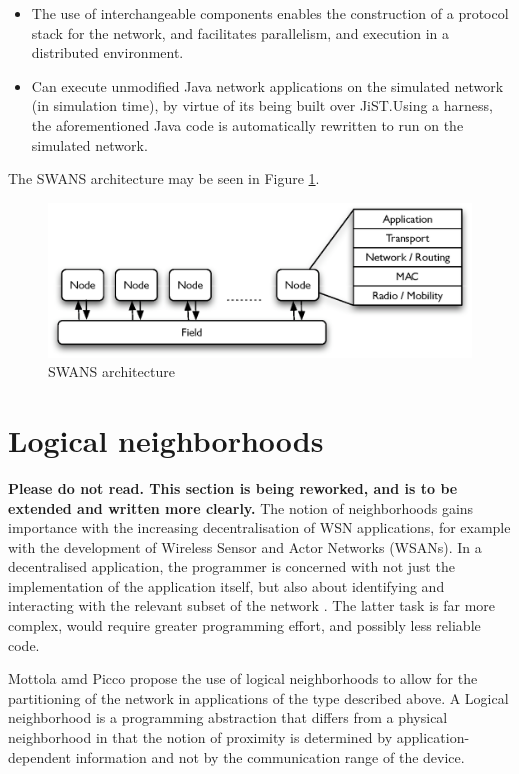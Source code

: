 \begin{itemize}
\item The use of
interchangeable components enables the construction of a protocol stack for the
network, and facilitates parallelism, and execution in a distributed environment.
\item Can execute unmodified Java network applications on the
simulated network (in simulation time), by virtue of its being built over
JiST.Using a harness, the aforementioned Java code is automatically rewritten to
run on the simulated network.  
\end{itemize}
   
The SWANS architecture may be seen in Figure \ref{Fig:SWANS_architecture}. 

\begin{figure}[ht]
\centering
\label{Fig:SWANS_architecture}
\includegraphics[scale=0.71]{img/SWANS_architecture.eps} \caption[SWANS 
architecture]{SWANS architecture}
\end{figure} 

\section {Logical neighborhoods} \label{LNDescription}
\textbf{Please do not read. This section is being reworked, and is to be
extended and written more clearly.}
 The notion of
neighborhoods gains importance with the increasing 
decentralisation of WSN applications, for example with the development of 
Wireless Sensor and Actor Networks (WSANs). In a decentralised application, the 
programmer is concerned with not just the implementation of the application 
itself, but also about identifying and interacting with the relevant subset of 
the network \cite{mottola_LN:2006}. The latter task is far more complex, would 
require greater programming effort, and possibly less reliable code.

Mottola amd Picco propose the use of logical neighborhoods to allow for the 
partitioning of the network in applications of the type described above. A 
Logical neighborhood is a programming abstraction that differs from a physical 
neighborhood in that the notion of proximity is determined by 
application-dependent information and not by the communication range of the 
device.

